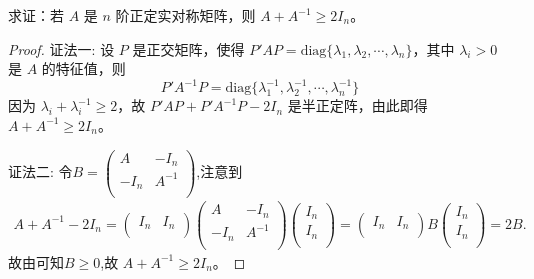 \documentclass[../../main.tex]{subfiles}%
\begin{document}
\begin{example}\label{proposition:例9.59}
求证：若 \(A\) 是 \(n\) 阶正定实对称矩阵，则 \(A + A^{-1} \geqslant  2I_n\)。
\end{example}
\begin{proof}

{\color{blue}证法一:}
设 \(P\) 是正交矩阵，使得 \(P'AP = \mathrm{diag}\{\lambda_1,\lambda_2,\cdots,\lambda_n\}\)，其中 \(\lambda_i > 0\) 是 \(A\) 的特征值，则
\[
P'A^{-1}P = \mathrm{diag}\{\lambda_1^{-1},\lambda_2^{-1},\cdots,\lambda_n^{-1}\}
\]
因为 \(\lambda_i + \lambda_i^{-1} \geqslant  2\)，故 \(P'AP + P'A^{-1}P - 2I_n\) 是半正定阵，由此即得 \(A + A^{-1} \geqslant  2I_n\)。

{\color{blue}证法二:}
令$B=\left( \begin{matrix}
A&		-I_n\\
-I_n&		A^{-1}\\
\end{matrix} \right) $,注意到
\begin{align*}
A+A^{-1}-2I_n=\left( \begin{matrix}
I_n&		I_n\\
\end{matrix} \right) \left( \begin{matrix}
A&		-I_n\\
-I_n&		A^{-1}\\
\end{matrix} \right) \left( \begin{array}{c}
I_n\\
I_n\\
\end{array} \right) =\left( \begin{matrix}
I_n&		I_n\\
\end{matrix} \right) B\left( \begin{array}{c}
I_n\\
I_n\\
\end{array} \right) =2B.
\end{align*}
故由可知$B\geqslant  0$,故 \(A + A^{-1} \geqslant  2I_n\)。 
\end{proof}
\end{document}
